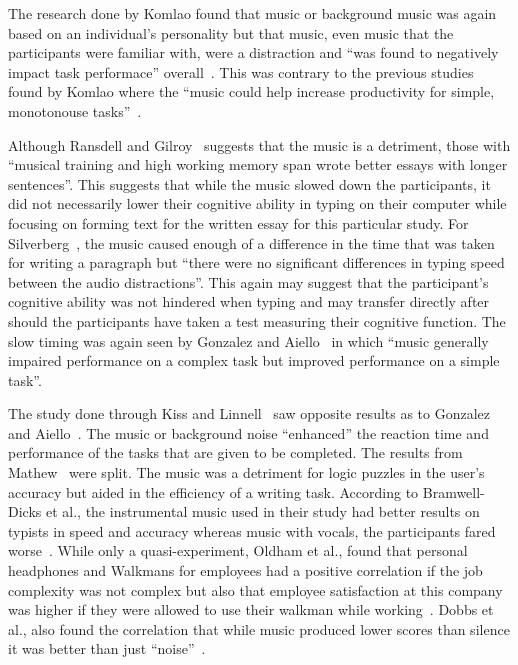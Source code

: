 \documentclass[manuscript, screen, review]{acmart} %
\begin{document}
The research done by Komlao found that music or background music was again based on an individual's personality but that music, even music that the participants were familiar with, were a distraction and ``was found to negatively impact task performace'' overall~\cite{komlao2018variations}.
This was contrary to the previous studies found by Komlao where the ``music could help increase productivity for simple, monotonouse tasks''~\cite{komlao2018variations}.

Although Ransdell and Gilroy~\cite{ransdell2001141} suggests that the music is a detriment, those with ``musical training and high working memory span wrote better essays with longer sentences''. 
This suggests that while the music slowed down the participants, it did not necessarily lower their cognitive ability in typing on their computer while focusing on forming text for the written essay for this particular study. 
For Silverberg~\cite{AudioDistractionsAshley}, the music caused enough of a difference in the time that was taken for writing a paragraph but ``there were no significant differences in typing speed between the audio distractions''. 
This again may suggest that the participant's cognitive ability was not hindered when typing and may transfer directly after should the participants have taken a test measuring their cognitive function. 
The slow timing was again seen by Gonzalez and Aiello~\cite{Gonzalez_Aiello_2019} in which ``music generally impaired performance on a complex task but improved performance on a simple task''. 

The study done through Kiss and Linnell~\cite{kiss2021effect} saw opposite results as to Gonzalez and Aiello~\cite{Gonzalez_Aiello_2019}. The music or background noise ``enhanced'' the reaction time and performance of the tasks that are given to be completed. 
The results from Mathew~\cite{mathew2022inherently} were split. 
The music was a detriment for logic puzzles in the user's accuracy but aided in the efficiency of a writing task. 
According to Bramwell-Dicks et al., the instrumental music used in their study had better results on typists in speed and accuracy whereas music with vocals, the participants fared worse~\cite{bramwell2016can}.
While only a quasi-experiment, Oldham et al., found that personal headphones and Walkmans for employees had a positive correlation if the job complexity was not complex but also that employee satisfaction at this company was higher if they were allowed to use their walkman while working~\cite{oldhamListen}. Dobbs et al., also found the correlation that while music produced lower scores than silence it was better than just ``noise''~\cite{effectsOfBackgroundDobbs}.
\end{document}
